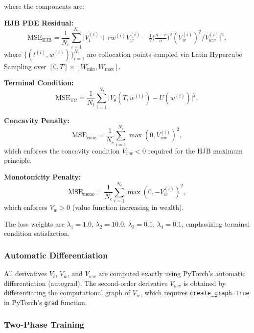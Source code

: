 \documentclass[12pt,a4paper]{article}
\newcommand{\HJB}{\text{HJB}}
\newcommand{\mse}{\text{MSE}}
\begin{document}
where the components are:

\textbf{HJB PDE Residual:}
\begin{equation}
\label{eq:loss_hjb}
\mse_\HJB = \frac{1}{N_c} \sum_{i=1}^{N_c} \bigl| V_t^{(i)} + r w^{(i)} V_w^{(i)} - \tfrac{1}{2} \bigl(\tfrac{\mu-r}{\sigma}\bigr)^2 (V_w^{(i)})^2 / V_{ww}^{(i)} \bigr|^2,
\end{equation}
where $\{(t^{(i)}, w^{(i)})\}_{i=1}^{N_c}$ are collocation points sampled via Latin Hypercube Sampling over $[0, T] \times [W_{\min}, W_{\max}]$.

\textbf{Terminal Condition:}
\begin{equation}
\label{eq:loss_tc}
\mse_{\text{TC}} = \frac{1}{N_t} \sum_{i=1}^{N_t} \bigl| V_\theta(T, w^{(i)}) - U(w^{(i)}) \bigr|^2,
\end{equation}

\textbf{Concavity Penalty:}
\begin{equation}
\label{eq:loss_conc}
\mse_{\text{conc}} = \frac{1}{N_c} \sum_{i=1}^{N_c} \max(0, V_{ww}^{(i)})^2,
\end{equation}
which enforces the concavity condition $V_{ww} < 0$ required for the HJB maximum principle.

\textbf{Monotonicity Penalty:}
\begin{equation}
\label{eq:loss_mono}
\mse_{\text{mono}} = \frac{1}{N_c} \sum_{i=1}^{N_c} \max(0, -V_w^{(i)})^2,
\end{equation}
which enforces $V_w > 0$ (value function increasing in wealth).

The loss weights are $\lambda_1 = 1.0$, $\lambda_2 = 10.0$, $\lambda_3 = 0.1$, $\lambda_4 = 0.1$, emphasizing terminal condition satisfaction.

\subsubsection{Automatic Differentiation}

All derivatives $V_t$, $V_w$, and $V_{ww}$ are computed exactly using PyTorch's automatic differentiation (autograd). The second-order derivative $V_{ww}$ is obtained by differentiating the computational graph of $V_w$, which requires \texttt{create\_graph=True} in PyTorch's \texttt{grad} function.

\subsubsection{Two-Phase Training}
\end{document}
